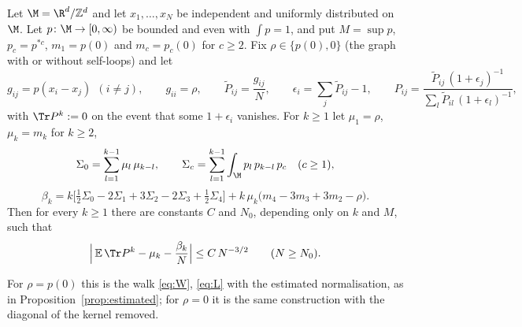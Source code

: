 

\begin{proposition}\label{prop:bias}
Let $\M=\R^d/\mathbb Z^d$ and let $x_1,\dots,x_N$ be independent and uniformly distributed on $\M$. Let $p\colon\M\to[0,\infty)$ be bounded and even with $\int p=1$, and put $M=\sup p$, $p_c=p^{*c}$, $m_1=p(0)$ and $m_c=p_c(0)$ for $c\ge2$. Fix $\rho\in\{p(0),0\}$ (the graph with or without self-loops) and let
\[
g_{ij}=p(x_i-x_j)\ \ (i\ne j),\qquad g_{ii}=\rho,\qquad\tilde P_{ij}=\frac{g_{ij}}N,\qquad\epsilon_i=\sum_j\tilde P_{ij}-1,\qquad P_{ij}=\frac{\tilde P_{ij}\,(1+\epsilon_j)^{-1}}{\sum_l\tilde P_{il}\,(1+\epsilon_l)^{-1}},
\]
with $\Tr P^k:=0$ on the event that some $1+\epsilon_i$ vanishes. For $k\ge1$ let $\mu_1=\rho$, $\mu_k=m_k$ for $k\ge2$,
\[
\Sigma_0=\sum_{l=1}^{k-1}\mu_l\,\mu_{k-l},\qquad\Sigma_c=\sum_{l=1}^{k-1}\int_\M p_l\,p_{k-l}\,p_c\quad(c\ge1),
\]
\[
\beta_k=k\Big[\tfrac12\Sigma_0-2\Sigma_1+3\Sigma_2-2\Sigma_3+\tfrac12\Sigma_4\Big]+k\,\mu_k\big(m_4-3m_3+3m_2-\rho\big).
\]
Then for every $k\ge1$ there are constants $C$ and $N_0$, depending only on $k$ and $M$, such that
\[
\Big|\,\mathbb E\,\Tr P^k-\mu_k-\frac{\beta_k}{N}\Big|\le C\,N^{-3/2}\qquad(N\ge N_0).
\]
\end{proposition}

For $\rho=p(0)$ this is the walk \eqref{eq:W}, \eqref{eq:L} with the estimated normalisation, as in Proposition~\ref{prop:estimated}; for $\rho=0$ it is the same construction with the diagonal of the kernel removed.

